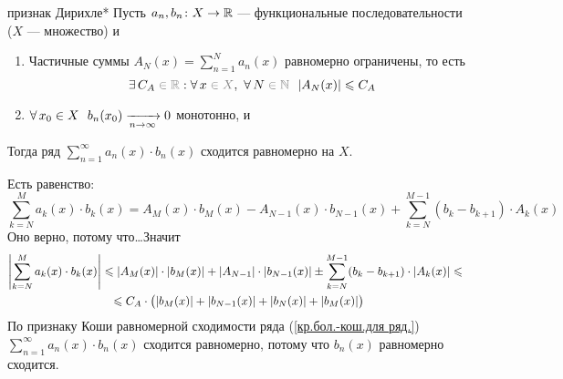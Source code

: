 \begin{teor}[https://youtu.be/9qXOGgTLQH8?si=E0w_tbdu46L_96fs&t=4135]{признак Дирихле}*
	Пусть $a_n, b_n \colon X \to \mathbb R$ --- функциональные последовательности ($X$ --- множество) и
	\begin{enumerate}
		\item Частичные суммы $A_N(x) = \sum\limits_{n = 1}^{N}a_n(x)$ равномерно ограничены, то есть
		\[\E C_A \uns{{}\in \rr} : \A x \uns{{}\in X},\ \A N \uns{{}\in \mathbb{N}}\ \ |A_N(x)| \< C_A\]
		
		\item $\forall \, x_0 \in X\ \ b_n(x_0) \xrightarrow[n \to \infty]{} 0$ монотонно, и 
	\end{enumerate}
	\hspace{20pt}Тогда ряд $\sum\limits_{n = 1}^{\infty} a_n(x) \cdot b_n(x)$ сходится равномерно на $X$.
\end{teor}

\begin{prf} Есть равенство:
	\[\sum_{k = N}^{M} a_k(x) \cdot b_k(x) = A_M(x) \cdot b_M(x) - A_{N-1}(x) \cdot b_{N-1}(x) + \sum_{k = N}^{M - 1}(b_k - b_{k+1}) \cdot A_k(x)\]
	Оно верно, потому что\dots \quad Значит
	\begin{gather*}
	\left|\sum_{k = N}^{M} a_k(x) \cdot b_k(x)\right| \leqslant |A_M(x)|\cdot |b_M(x)| + |A_{N-1}|\cdot |b_{N-1}(x)| \pm \sum_{k = N}^{M-1} (b_k - b_{k+1}) \cdot |A_k(x)| \leqslant{} \\
 	{}\leqslant C_A \cdot \bigl(|b_M(x)| + |b_{N-1}(x)| + |b_N(x)| + |b_M(x)|\bigr)
	\end{gather*}
	По признаку Коши равномерной сходимости ряда (\ref{кр.бол.-кош.для ряд.}) $\sum\limits_{n = 1}^{\infty} a_n(x) \cdot b_n(x)$ сходится равномерно, потому что $b_n(x)$ равномерно сходится.
\end{prf}